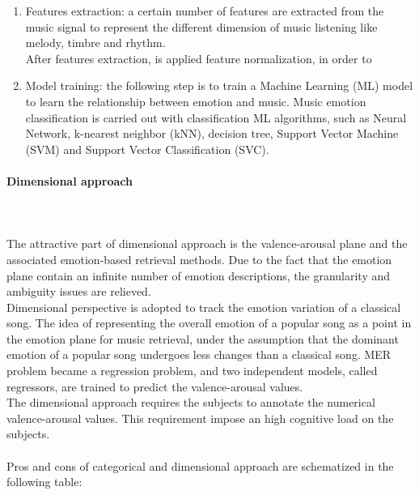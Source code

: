 \begin{enumerate}
	\item Features extraction: a certain number of features are extracted from the music signal to represent the different dimension of music listening like melody, timbre and rhythm.
	\\ After features extraction, is applied feature normalization, in order to 
	\item Model training: the following step is to train a Machine Learning (ML) model to learn the relationship between emotion and music. Music emotion classification is carried out with classification ML algorithms, such as Neural Network, k-nearest neighbor (kNN), decision tree, Support Vector Machine (SVM) and Support Vector Classification (SVC).
\end{enumerate}

\paragraph{Dimensional approach}
\mbox{} \\ \\ \indent
The attractive part of dimensional approach is the valence-arousal plane and the associated emotion-based retrieval methods. Due to the fact that the emotion plane contain an infinite number of emotion descriptions, the granularity and ambiguity issues are relieved.
\\
Dimensional perspective is adopted to track the emotion variation of a classical song. The idea of representing the overall emotion of a popular song as a point in the emotion plane for music retrieval, under the assumption that the dominant emotion of a popular song undergoes less changes than a classical song. MER problem became a regression problem, and two independent models, called regressors, are trained to predict the valence-arousal values.
\\
The dimensional approach requires the subjects to annotate the numerical valence-arousal values. This requirement impose an high cognitive load on the subjects.
\\ \\
Pros and cons of categorical and dimensional approach are schematized in the following table:
